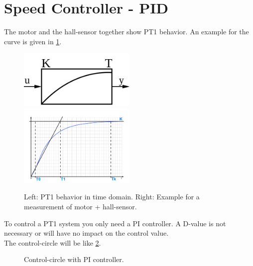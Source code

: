 \section{Speed Controller - PID}

The motor and the hall-sensor together show PT1 behavior. An example for the curve is given in \ref{pt1}.

\begin{figure}[ht] 
	\includegraphics[width=0.5\textwidth]{figures/pt1.png}
	\includegraphics[width=0.5\textwidth]{figures/pt1_exact.pdf}
	\caption{Left: PT1 behavior in time domain. Right: Example for a measurement of motor + hall-sensor.} \label{pt1}
\end{figure}

To control a PT1 system you only need a PI controller. A D-value is not necessary or will have no impact on the control value.\\
The control-circle will be like \ref{circle}.

 \begin{figure}[ht] 
	\caption{Control-circle with PI controller.} \label{circle}
\end{figure}



